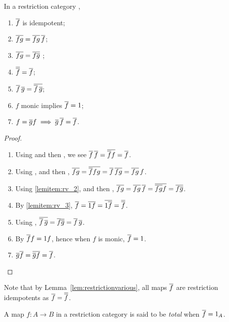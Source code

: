 \begin{lemma}\label{lem:restrictionvarious}
  In a restriction category \X,
  \begin{multicols}{2}
    \begin{enumerate}[{(}i{)}]
      \item{}$\overline{f}$ is idempotent;
      \item{} $\overline{f g} = \overline{f g} \, \overline{f}$;\label{lemitem:rv_2}
      \item{} $\overline{f g} = \overline{f \overline{g}}$ ;\label{lemitem:rv_3}
      \item{} $\overline{\overline{f}} = \overline{f}$;
      \item{} $\overline{f}\,\overline{g} = \overline{\overline{f}\,\overline{g}}$;
      \item{} $f$ monic implies $\overline{f} = 1$;
      \item{} $f = \overline{g} f \implies \overline{g}\,\overline{f} = \overline{f}$.
      \\
    \end{enumerate}
  \end{multicols}
\end{lemma}
\begin{proof}
  \prepprooflist
  \begin{enumerate}[{(}i{)}]
    \item Using \rthree and then \rone, we see $\overline{f}\,\overline{f} = \overline{\overline{f} f} = \overline{f}$.
    \item Using \rone, \rthree and then \rtwo, $\overline{f g} = \overline{\overline{f} f g} = \overline{f}\,\overline{f g} =
      \overline{f g}\, f$.
    \item Using \ref{lemitem:rv_2}, \rthree and then \rfour, $\overline{f g} = \overline{f g}\,\overline{f} =
      \overline{\overline{f g} f} = \overline{f\overline{g}}$.
    \item By \ref{lemitem:rv_3}, $\overline{f} = \overline{1 f} = \overline{1 \overline{f}} = \overline{\overline{f}}$.
    \item Using \rthree, $\overline{\overline{f}\,\overline{g}} = \overline{f}\overline{\overline{g}} = \overline{f}\,\overline{g}$.
    \item By \rone $\overline{f} f = 1 f$, hence when $f$ is monic, $\overline{f} = 1$.
    \item $\overline{g}\overline{f} = \overline{\overline{g} f} = \overline{f}$.
  \end{enumerate}
\end{proof}

Note that by Lemma~\ref{lem:restrictionvarious}, all maps $\overline{f}$ are restriction idempotents
as $\overline{f}=\overline{\overline{f}}$.


\begin{definition}\label{def:total_map}
  A map $f:A\to B$ in a restriction category is said to be \emph{total} when
  $\overline{f} = 1_A$.
\end{definition}

